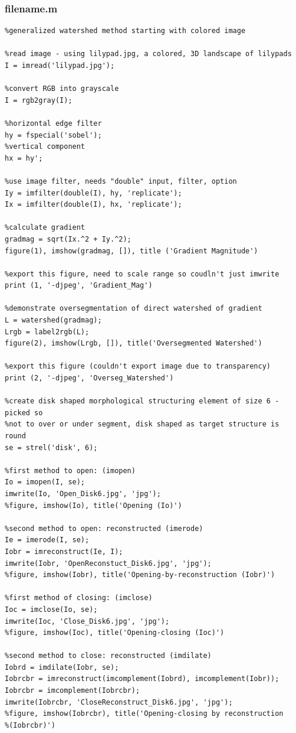 \documentclass[12pt]{article}
\theoremstyle{plain}%
\theoremstyle{definition}
\theoremstyle{remark}
\begin{document}
\subsubsection{filename.m}
\begin{verbatim}
%generalized watershed method starting with colored image

%read image - using lilypad.jpg, a colored, 3D landscape of lilypads
I = imread('lilypad.jpg');

%convert RGB into grayscale
I = rgb2gray(I);

%horizontal edge filter
hy = fspecial('sobel');
%vertical component
hx = hy';

%use image filter, needs "double" input, filter, option
Iy = imfilter(double(I), hy, 'replicate');
Ix = imfilter(double(I), hx, 'replicate');

%calculate gradient
gradmag = sqrt(Ix.^2 + Iy.^2);
figure(1), imshow(gradmag, []), title ('Gradient Magnitude')

%export this figure, need to scale range so coudln't just imwrite
print (1, '-djpeg', 'Gradient_Mag')

%demonstrate oversegmentation of direct watershed of gradient
L = watershed(gradmag);
Lrgb = label2rgb(L);
figure(2), imshow(Lrgb, []), title('Oversegmented Watershed')

%export this figure (couldn't export image due to transparency)
print (2, '-djpeg', 'Overseg_Watershed')

%create disk shaped morphological structuring element of size 6 - picked so
%not to over or under segment, disk shaped as target structure is round
se = strel('disk', 6);

%first method to open: (imopen)
Io = imopen(I, se);
imwrite(Io, 'Open_Disk6.jpg', 'jpg');
%figure, imshow(Io), title('Opening (Io)')

%second method to open: reconstructed (imerode)
Ie = imerode(I, se);
Iobr = imreconstruct(Ie, I);
imwrite(Iobr, 'OpenReconstuct_Disk6.jpg', 'jpg');
%figure, imshow(Iobr), title('Opening-by-reconstruction (Iobr)')

%first method of closing: (imclose)
Ioc = imclose(Io, se);
imwrite(Ioc, 'Close_Disk6.jpg', 'jpg');
%figure, imshow(Ioc), title('Opening-closing (Ioc)')

%second method to close: reconstructed (imdilate)
Iobrd = imdilate(Iobr, se);
Iobrcbr = imreconstruct(imcomplement(Iobrd), imcomplement(Iobr));
Iobrcbr = imcomplement(Iobrcbr);
imwrite(Iobrcbr, 'CloseReconstruct_Disk6.jpg', 'jpg');
%figure, imshow(Iobrcbr), title('Opening-closing by reconstruction
%(Iobrcbr)')


\end{verbatim}
\end{document}
